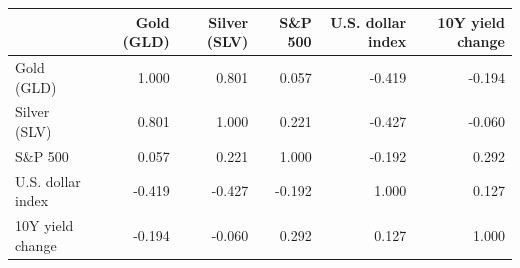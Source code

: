 \begin{tabular}{lrrrrr}
\toprule
 & Gold (GLD) & Silver (SLV) & S\&P 500 & U.S. dollar index & 10Y yield change \\
\midrule
Gold (GLD) & 1.000 & 0.801 & 0.057 & -0.419 & -0.194 \\
Silver (SLV) & 0.801 & 1.000 & 0.221 & -0.427 & -0.060 \\
S\&P 500 & 0.057 & 0.221 & 1.000 & -0.192 & 0.292 \\
U.S. dollar index & -0.419 & -0.427 & -0.192 & 1.000 & 0.127 \\
10Y yield change & -0.194 & -0.060 & 0.292 & 0.127 & 1.000 \\
\bottomrule
\end{tabular}
